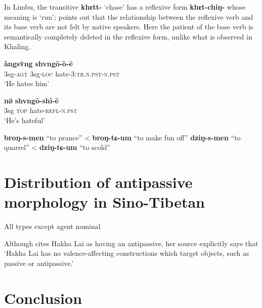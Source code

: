 \documentclass[oneside,a4paper,11pt]{article}
\newcommand{\ipa}[1]{{\phon\textbf{#1}}}
\begin{document}
In Limbu,  the transitive \ipa{khɛtt-} `chase' has a reflexive form \ipa{khɛt-chiŋ-} whose meaning is `run'; \citet[87]{driem87} points out that the relationship between the reflexive verb and its base verb are not felt by native speakers. Here the patient of the base verb is semantically completely deleted in the reflexive form, unlike what is observed in Khaling.



\citet[294]{lapolla01valency}
\begin{exe}
\ex 
\gll \ipa{à:ngi} \ipa{àngsv̀ng} \ipa{shvngō-ò-ē} \\
3sg-\textsc{agt} 3sg-\textsc{loc} hate-\textsc{3:tr.n.pst-n.pst} \\
\glt `He hates him'
\end{exe}
\begin{exe}
\ex 
\gll  \ipa{àng} \ipa{nø̄} \ipa{shvngō-shì-ē} \\
3sg \textsc{top} hate-\textsc{refl-n.pst} \\
\glt `He's hateful'
 \end{exe}
\citet[452;466]{widmer14bunan}
\ipa{broŋ-s-men} “to prance” < \ipa{broŋ-tɕ-um} “to make fun off”
\ipa{dziŋ-s-men} “to quarrel” < \ipa{dziŋ-tɕ-um} “to scold”

\section{Distribution of antipassive morphology in Sino-Tibetan}
All types except agent nominal

Although \citet{polinsky11antipassive} cites Hakha Lai as having an antipassive, her source \citet[37]{peterson07appl} explicitly says that `Hakha Lai has no valence-affecting constructions which target objects, such as passive or antipassive.'


\section*{Conclusion}




 
\end{document}
